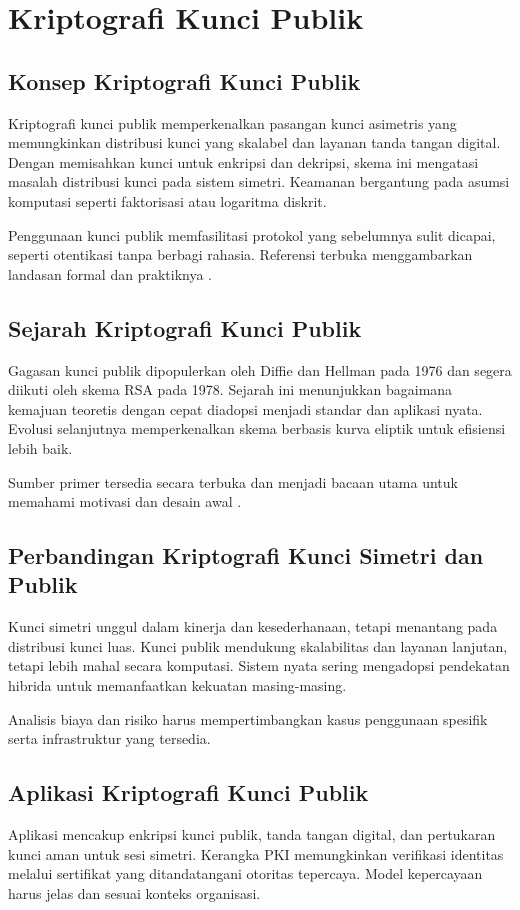 \documentclass[../main.tex]{subfiles}
\begin{document}
\chapter{Kriptografi Kunci Publik}

\section{Konsep Kriptografi Kunci Publik}
Kriptografi kunci publik memperkenalkan pasangan kunci asimetris yang memungkinkan distribusi kunci yang skalabel dan layanan tanda tangan digital. Dengan memisahkan kunci untuk enkripsi dan dekripsi, skema ini mengatasi masalah distribusi kunci pada sistem simetri. Keamanan bergantung pada asumsi komputasi seperti faktorisasi atau logaritma diskrit.

Penggunaan kunci publik memfasilitasi protokol yang sebelumnya sulit dicapai, seperti otentikasi tanpa berbagi rahasia. Referensi terbuka menggambarkan landasan formal dan praktiknya \parencite{diffie1976new}.

\section{Sejarah Kriptografi Kunci Publik}
Gagasan kunci publik dipopulerkan oleh Diffie dan Hellman pada 1976 dan segera diikuti oleh skema RSA pada 1978. Sejarah ini menunjukkan bagaimana kemajuan teoretis dengan cepat diadopsi menjadi standar dan aplikasi nyata. Evolusi selanjutnya memperkenalkan skema berbasis kurva eliptik untuk efisiensi lebih baik.

Sumber primer tersedia secara terbuka dan menjadi bacaan utama untuk memahami motivasi dan desain awal \parencite{diffie1976new,rsa1978}.

\section{Perbandingan Kriptografi Kunci Simetri dan Publik}
Kunci simetri unggul dalam kinerja dan kesederhanaan, tetapi menantang pada distribusi kunci luas. Kunci publik mendukung skalabilitas dan layanan lanjutan, tetapi lebih mahal secara komputasi. Sistem nyata sering mengadopsi pendekatan hibrida untuk memanfaatkan kekuatan masing-masing.

Analisis biaya dan risiko harus mempertimbangkan kasus penggunaan spesifik serta infrastruktur yang tersedia.

\section{Aplikasi Kriptografi Kunci Publik}
Aplikasi mencakup enkripsi kunci publik, tanda tangan digital, dan pertukaran kunci aman untuk sesi simetri. Kerangka PKI memungkinkan verifikasi identitas melalui sertifikat yang ditandatangani otoritas tepercaya. Model kepercayaan harus jelas dan sesuai konteks organisasi.
\end{document}
